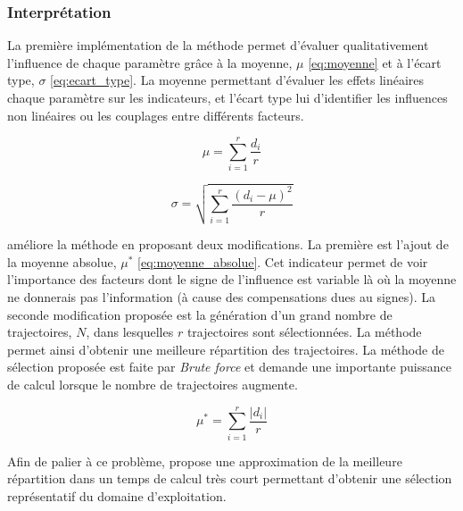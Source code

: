 

\subsubsection{Interprétation} %
\label{ssub:interpretation}
La première implémentation de la méthode permet d’évaluer qualitativement l’influence de chaque
paramètre grâce à la moyenne, $\mu$ \eqref{eq:moyenne} et à l’écart type, $\sigma$ \eqref{eq:ecart_type}.
La moyenne permettant d’évaluer les effets linéaires chaque paramètre sur les indicateurs,
et l’écart type lui d’identifier les influences non linéaires ou les couplages entre différents facteurs.

\begin{equation}\label{eq:moyenne}
    \mu = \sum_{i = 1}^{r} \frac{d_{i}}{r}
\end{equation}

\begin{equation}\label{eq:ecart_type}
    \sigma = \sqrt{\sum_{i=1}^{r}\frac{(d_{i} - \mu)^{2}}{r}}
\end{equation}

\cite{Campolongo20071509} améliore la méthode en proposant deux modifications. La première
est l’ajout de la moyenne absolue, $\mu^{*}$ \eqref{eq:moyenne_absolue}. Cet indicateur permet
de voir l’importance des facteurs dont le signe de l’influence est variable là où
la moyenne ne donnerais pas l’information (à cause des compensations dues au signes).
La seconde modification proposée est la génération d’un grand nombre de trajectoires, $N$,
dans lesquelles $r$ trajectoires sont sélectionnées. La méthode permet ainsi
d’obtenir une meilleure répartition des trajectoires.
La méthode de sélection proposée est faite par \emph{Brute force} et demande une
importante puissance de calcul lorsque le nombre de trajectoires augmente.

\begin{equation}\label{eq:moyenne_absolue}
    \mu^{*} = \sum_{i = 1}^{r} \frac{\lvert d_{i} \rvert}{r}
\end{equation}

Afin de palier à ce problème, \cite{Ruano2012103} propose une approximation de
la meilleure répartition dans un temps de calcul très court permettant d’obtenir
une sélection représentatif du domaine d’exploitation.


